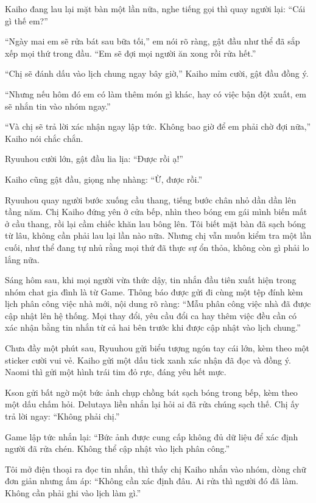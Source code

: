 \documentclass[../main.tex]{subfiles}
\begin{document}
Kaiho đang lau lại mặt bàn một lần nữa, nghe tiếng gọi thì quay người lại: ``Cái gì thế em?''

``Ngày mai em sẽ rửa bát sau bữa tối,'' em nói rõ ràng, gật đầu như thể đã sắp xếp mọi thứ trong đầu. ``Em sẽ đợi mọi người ăn xong rồi rửa hết.''

``Chị sẽ đánh dấu vào lịch chung ngay bây giờ,'' Kaiho mỉm cười, gật đầu đồng ý.

``Nhưng nếu hôm đó em có làm thêm món gì khác, hay có việc bận đột xuất, em sẽ nhắn tin vào nhóm ngay.''

``Và chị sẽ trả lời xác nhận ngay lập tức. Không bao giờ để em phải chờ đợi nữa,'' Kaiho nói chắc chắn.

Ryuuhou cười lớn, gật đầu lia lịa: ``Được rồi ạ!''

Kaiho cũng gật đầu, giọng nhẹ nhàng: ``Ừ, được rồi.''

Ryuuhou quay người bước xuống cầu thang, tiếng bước chân nhỏ dần dần lên tầng năm. Chị Kaiho đứng yên ở cửa bếp, nhìn theo bóng em gái mình biến mất ở cầu thang, rồi lại cầm chiếc khăn lau bông lên. Tôi biết mặt bàn đã sạch bóng từ lâu, không cần phải lau lại lần nào nữa. Nhưng chị vẫn muốn kiểm tra một lần cuối, như thể đang tự nhủ rằng mọi thứ đã thực sự ổn thỏa, không còn gì phải lo lắng nữa.

\omk

Sáng hôm sau, khi mọi người vừa thức dậy, tin nhắn đầu tiên xuất hiện trong nhóm chat gia đình là từ Game. Thông báo được gửi đi cùng một tệp đính kèm lịch phân công việc nhà mới, nội dung rõ ràng: ``Mẫu phân công việc nhà đã được cập nhật lên hệ thống. Mọi thay đổi, yêu cầu đổi ca hay thêm việc đều cần có xác nhận bằng tin nhắn từ cả hai bên trước khi được cập nhật vào lịch chung.''

Chưa đầy một phút sau, Ryuuhou gửi biểu tượng ngón tay cái lớn, kèm theo một sticker cười vui vẻ. Kaiho gửi một dấu tick xanh xác nhận đã đọc và đồng ý. Naomi thì gửi một hình trái tim đỏ rực, đáng yêu hết mực.

Kson gửi bất ngờ một bức ảnh chụp chồng bát sạch bóng trong bếp, kèm theo một dấu chấm hỏi. Delutaya liền nhắn lại hỏi ai đã rửa chúng sạch thế. Chị ấy trả lời ngay: ``Không phải chị.''

Game lập tức nhắn lại: ``Bức ảnh được cung cấp không đủ dữ liệu để xác định người đã rửa chén. Không thể cập nhật vào lịch phân công.''

Tôi mở điện thoại ra đọc tin nhắn, thì thấy chị Kaiho nhắn vào nhóm, dòng chữ đơn giản nhưng ấm áp: ``Không cần xác định đâu. Ai rửa thì người đó đã làm. Không cần phải ghi vào lịch làm gì.''
\end{document}
